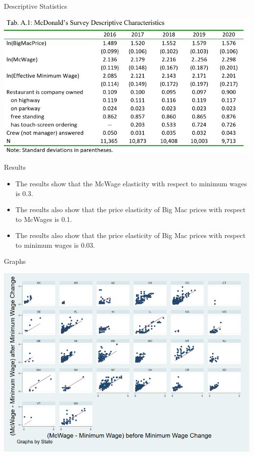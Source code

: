 \documentclass[12pt]{beamer}
\begin{document}
\begin{frame}[allowframebreaks]{Descriptive Statistics}
	\begin{center}
		\includegraphics[width=1.0\linewidth]{assets/discriptive.png}
	\end{center}
\end{frame}

\begin{frame}[allowframebreaks]{Results}
	\begin{itemize}
		\item The results show that the McWage elasticity with respect to minimum wages is 0.3.
		\item The results also show that the price elasticity of Big Mac prices with respect to McWages is 0.1.
		\item The results also show that the price elasticity of Big Mac prices with respect to minimum wages is 0.03.
	\end{itemize}
\end{frame}

\begin{frame}[allowframebreaks]{Graphs}
	\begin{center}
		\includegraphics[width=1.0\linewidth]{assets/graphs.png}
	\end{center}
\end{frame}
\end{document}
